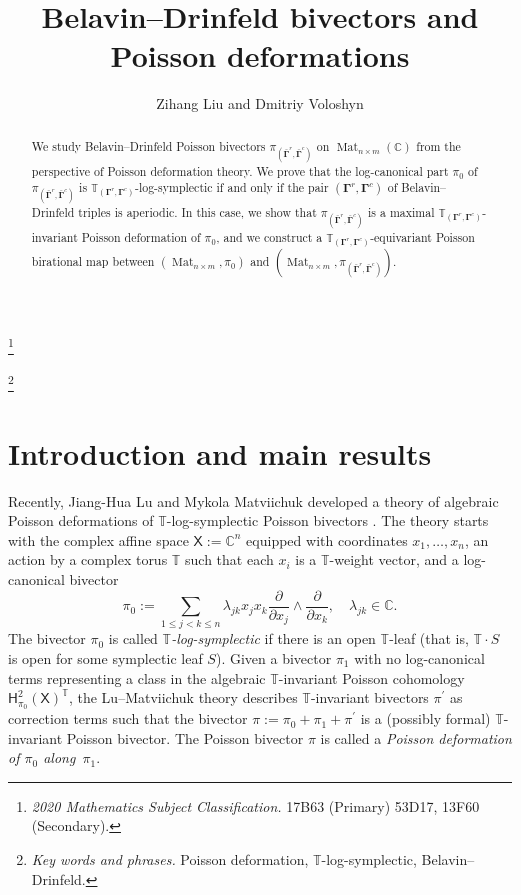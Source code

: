\documentclass[11pt]{article}
\title{Belavin--Drinfeld bivectors and Poisson deformations}
\author{Zihang Liu and Dmitriy Voloshyn}
\date{}
\newcommand{\bbg}{\bar{\mathbf{\Gamma}}}
\newcommand{\bg}{\mathbf{\Gamma}}
\DeclareMathOperator{\Mat}{Mat}
\theoremstyle{definition}\newtheorem{definition}[theorem]{Definition}
\theoremstyle{definition}\newtheorem{remark}[theorem]{Remark}
\theoremstyle{remark}
\numberwithin{equation}{section}
\begin{document}
\maketitle

\newcommand{\blfootnote}[1]{%
    \begingroup
    \begin{NoHyper}
        \renewcommand{\thefootnote}{}%
        \footnote{#1}%
        \addtocounter{footnote}{-1}%
    \end{NoHyper}
    \endgroup
}

\begin{abstract}
    We study Belavin--Drinfeld Poisson bivectors $\pi_{(\bbg^r,\bbg^c)}$ on $\Mat_{n\times m}(\mathbb{C})$ from the perspective of Poisson deformation theory. We prove that the log-canonical part $\pi_0$ of $\pi_{(\bbg^r,\bbg^c)}$ is $\mathbb{T}_{(\bg^r,\bg^c)}$-log-symplectic if and only if the pair $(\bg^r,\bg^c)$ of Belavin--Drinfeld triples is aperiodic. In this case, we show that $\pi_{(\bbg^r,\bbg^c)}$ is a maximal $\mathbb{T}_{(\bg^r,\bg^c)}$-invariant Poisson deformation of $\pi_0$, and we construct a  $\mathbb{T}_{(\bg^r,\bg^c)}$-equivariant Poisson birational map between $(\Mat_{n\times m},\pi_0)$ and $(\Mat_{n\times m},\pi_{(\bbg^r,\bbg^c)})$.
\end{abstract}

\tableofcontents

\blfootnote{\textit{2020 Mathematics Subject Classification.} 17B63 (Primary) 53D17, 13F60 (Secondary).}
\blfootnote{\textit{Key words and phrases.} Poisson deformation, $\mathbb{T}$-log-symplectic, Belavin--Drinfeld.}

\section{Introduction and main results}
Recently, Jiang-Hua Lu and Mykola Matviichuk developed a theory of algebraic Poisson deformations of $\mathbb{T}$-log-symplectic Poisson bivectors \cite{lm-deform}. The theory starts with the complex affine space $\mathsf{X} := \mathbb{C}^n$ equipped with coordinates $x_1,\ldots,x_n$, an action by a complex torus $\mathbb{T}$ such that each $x_i$ is a $\mathbb{T}$-weight vector, and a log-canonical bivector
\begin{equation*}
    \pi_0 := \sum_{1 \leq j<k \leq n} \lambda_{jk} x_j x_k \frac{\partial}{\partial x_j} \wedge \frac{\partial}{\partial x_k},\quad 
    \lambda_{jk} \in \mathbb{C}.
\end{equation*}
The bivector $\pi_0$ is called \emph{$\mathbb{T}$-log-symplectic} if there is an open $\mathbb{T}$-leaf (that is, $\mathbb{T}\cdot S$ is open for some symplectic leaf $S$). Given a bivector $\pi_1$ with no log-canonical terms representing a class in the algebraic $\mathbb{T}$-invariant Poisson cohomology $ \mathsf{H}_{\pi_0}^2(\mathsf{X})^{\mathbb{T}}$, the Lu--Matviichuk theory describes $\mathbb{T}$-invariant bivectors $\pi^\prime$ as correction terms such that the bivector $\pi:=\pi_0 + \pi_1 + \pi^\prime$ is a (possibly formal) $\mathbb{T}$-invariant Poisson bivector. The Poisson bivector $\pi$ is called a \emph{Poisson deformation of $\pi_0$ along~$\pi_1$}.
\end{document}
